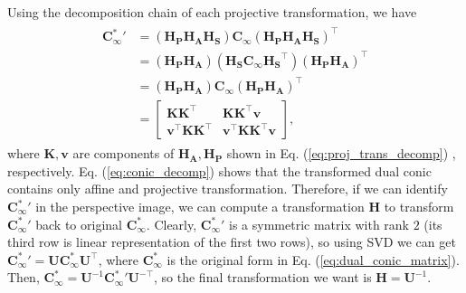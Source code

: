 \documentclass[12pt]{article}
\numberwithin{equation}{section}
\begin{document}
Using the decomposition chain of each projective transformation, we have
\begin{align}
\begin{split}
{\mathbf{C}_{\infty}^{*}}' &= (\mathbf{H_PH_AH_S})\mathbf{C}_{\infty}(\mathbf{H_PH_AH_S})^\top \\
&= (\mathbf{H_PH_A})(\mathbf{H_S}\mathbf{C}_{\infty}\mathbf{H_S}^\top)(\mathbf{H_PH_A})^\top \\
&= (\mathbf{H_PH_A})\mathbf{C}_{\infty}(\mathbf{H_PH_A})^\top \\
&= 
\begin{bmatrix}
\mathbf{KK^\top} & \mathbf{KK^\top v} \\
\mathbf{v^\top KK^\top} & \mathbf{v^\top KK^\top v}
\end{bmatrix},
\end{split}
\label{eq:conic_decomp}
\end{align}
where $\mathbf{K,v}$ are components of $\mathbf{H_A, H_P}$ shown in Eq. (\ref{eq:proj_trans_decomp}) , respectively. Eq. (\ref{eq:conic_decomp}) shows that the transformed dual conic contains only affine and projective transformation. Therefore, if we can identify ${\mathbf{C}_{\infty}^{*}}'$ in the perspective image, we can compute a transformation $\mathbf{H}$ to transform ${\mathbf{C}_{\infty}^{*}}'$ back to original $\mathbf{C}_{\infty}^{*}$. Clearly, ${\mathbf{C}_{\infty}^{*}}'$ is a symmetric matrix with rank $2$ (its third row is linear representation of the first two rows), so using SVD we can get ${\mathbf{C}_{\infty}^{*}}' = \mathbf{U}\mathbf{C}_{\infty}^{*}\mathbf{U}^\top$, where $\mathbf{C}_{\infty}^{*}$ is the original form in Eq. (\ref{eq:dual_conic_matrix}). Then, $\mathbf{C}_{\infty}^{*} = \mathbf{U}^{-1}{\mathbf{C}_{\infty}^{*}}'\mathbf{U}^{-\top}$, so the final transformation we want is $\mathbf{H} = \mathbf{U}^{-1}$.
\end{document}
